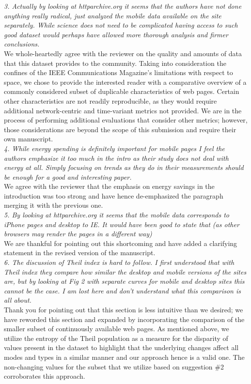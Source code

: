 \documentclass[11pt, draftclsnofoot, onecolumn]{IEEEtran}
\begin{document}
{{\noindent \textit{3. Actually by looking at httparchive.org it seems that the authors have not done anything really radical, just analyzed the mobile data available on the site separately. While science does not need to be complicated having access to such good dataset would perhaps have allowed more thorough analysis and firmer conclusions.}\\
We whole-heartedly agree with the reviewer on the quality and amounts of data that this dataset provides to the community. 
Taking into consideration the confines of the IEEE Communications Magazine's limitations with respect to space, we chose to provide the interested reader with a comparative overview of a commonly considered subset of duplicable characteristics of web pages.
Certain other characteristics are not readily reproducible, as they would require additional network-centric and time-variant metrics not provided.
We are in the process of performing additional evaluations that consider other metrics; however, those considerations are beyond the scope of this submission and require their own manuscript.\\


\noindent \textit{4. While energy spending is definitely important for mobile pages I feel the authors emphasize it too much in the intro as their study does not deal with energy at all. Simply focusing on trends as they do in their measurements should be enough for a good and interesting paper. }\\
We agree with the reviewer that the emphasis on energy savings in the introduction was too strong and have hence de-emphasized the paragraph merging it with the previous one.\\

\noindent \textit{5. By looking at httparchive.org it seems that the mobile data corresponds to iPhone pages and desktop to IE. It would have been good to state that (as other browsers may render the pages in a different way)}\\
We are thankful for pointing out this shortcoming and have added a clarifying statement in the revised version of the manuscript.\\


\noindent \textit{6. The discussion of Theil index is hard to follow. I first understood that with Theil index they compare how similar the desktop and mobile versions of the sites are, but by looking at Fig 2 with separate curves for mobile and desktop sites this cannot be the case. I am lost here and don't understand what this comparison is all about.}\\
Thank you for pointing out that this section is less intuitive than we desired; we have reworded this section and expanded by incorporating the comparison of the smaller subset of continuously available web pages. As mentioned above, we utilize the entropy of the Theil population as a measure for the disparity of values present in the dataset to highlight that the underlying changes affect all modes and types in a similar manner and our approach hence is a valid one. The non-changing values for the subset that we utilize based on suggestion \#2 corroborates this approach.\\

}}
\end{document}
